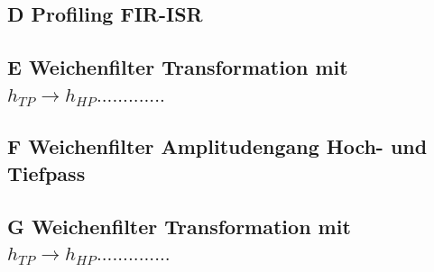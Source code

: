 \subsection{D Profiling FIR-ISR}

\subsection{E Weichenfilter Transformation mit $h_{TP} \rightarrow h_{HP} .............$}

\subsection{F Weichenfilter Amplitudengang Hoch- und Tiefpass}

\subsection{G Weichenfilter Transformation mit $h_{TP} \rightarrow h_{HP} ..............$}
 
